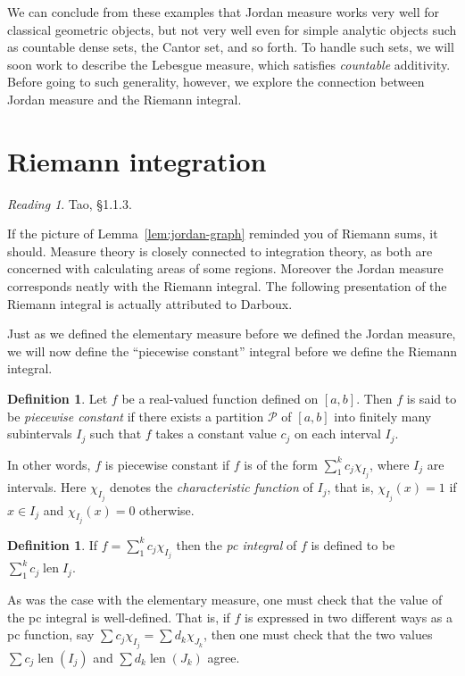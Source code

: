 \documentclass[11pt,oneside]{amsbook}
\DeclareMathOperator{\len}{len}
\theoremstyle{definition}
\theoremstyle{plain}
\theoremstyle{definition}
\newtheorem{defn}[thm]{Definition}
\theoremstyle{remark}
\newtheorem*{reading}{Reading}
\numberwithin{equation}{section}
\numberwithin{figure}{section}
\begin{document}
We can conclude from these examples that Jordan measure works very well for classical geometric objects, but not very well even for simple analytic objects such as countable dense sets, the Cantor set, and so forth. To handle such sets, we will soon work to describe the Lebesgue measure, which  satisfies \emph{countable} additivity. Before going to such generality, however, we explore the connection between Jordan measure and the Riemann integral.


\section{Riemann integration}

\begin{reading}
  Tao, \S1.1.3.
\end{reading}

If the picture of Lemma~\ref{lem:jordan-graph} reminded you of Riemann sums, it should. Measure theory is closely connected to integration theory, as both are concerned with calculating areas of some regions. Moreover the Jordan measure corresponds neatly with the Riemann integral. The following presentation of the Riemann integral is actually attributed to Darboux.

Just as we defined the elementary measure before we defined the Jordan measure, we will now define the ``piecewise constant'' integral before we define the Riemann integral.

\begin{defn}
  Let $f$ be a real-valued function defined on $[a,b]$. Then $f$ is said to be \emph{piecewise constant} if there exists a partition $\mathcal P$ of $[a,b]$ into finitely many subintervals $I_j$ such that $f$ takes a constant value $c_j$ on each interval $I_j$.
\end{defn}

In other words, $f$ is piecewise constant if $f$ is of the form $\sum_1^k c_j\chi_{I_j}$, where $I_j$ are intervals. Here $\chi_{I_j}$ denotes the \emph{characteristic function} of $I_j$, that is, $\chi_{I_j}(x)=1$ if $x\in I_j$ and $\chi_{I_j}(x)=0$ otherwise.

\begin{defn}
  If $f=\sum_1^kc_j\chi_{I_j}$ then the \emph{pc integral} of $f$ is defined to be $\sum_1^kc_j\len I_j$.
\end{defn}

As was the case with the elementary measure, one must check that the value of the pc integral is well-defined. That is, if $f$ is expressed in two different ways as a pc function, say $\sum c_j\chi_{I_j}=\sum d_k\chi_{J_k}$, then one must check that the two values $\sum c_j\len(I_j)$ and $\sum d_k\len(J_k)$ agree.
\end{document}
